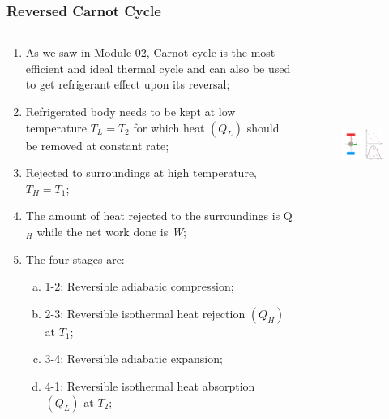 \documentclass[10pt,compress]{beamer}
\begin{document}
\begin{frame}
 \frametitle{Reversed Carnot Cycle}
  \begin{columns}
   \begin{column}[c]{0.45\linewidth}
    \begin{enumerate}[(1)]\scriptsize
      \item <1-> As we saw in Module 02, Carnot cycle is the most efficient and ideal thermal cycle and can also be used to get refrigerant effect upon its reversal;
      \item <1-> Refrigerated body needs to be kept at low temperature $T_{L}=T_{2}$ for which heat $\left(Q_{L}\right)$ should be removed at constant rate;
      \item <1-> Rejected to surroundings at high temperature, $T_{H}=T_{1}$;
      \item <1-> The amount of heat rejected to the surroundings is Q$_{H}$ while the net work done is {\it W};
      \item <1->The four stages are:
        \begin{enumerate}[(a)]\scriptsize
          \item<2-> 1-2: Reversible adiabatic compression;
          \item<2-> 2-3: Reversible isothermal heat rejection $\left(Q_{H}\right)$ at $T_{1}$;
          \item<2-> 3-4: Reversible adiabatic expansion;
          \item<2-> 4-1: Reversible isothermal heat absorption $\left(Q_{L}\right)$ at $T_{2}$;
        \end{enumerate}
     \end{enumerate}
   \end{column}
   \begin{column}[c]{0.55\linewidth}
    \begin{figure}%
     \begin{center}
      \includegraphics[width=6.8cm,height=6.5cm]{./Pics/Overview_Refrig4}
     \end{center}
    \end{figure}  
   \end{column}   
  \end{columns}
\end{frame}
 
\end{document}
